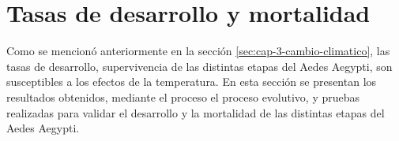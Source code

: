 \section{Tasas de desarrollo y mortalidad}

Como se mencionó anteriormente en la sección \ref{sec:cap-3-cambio-climatico}, las tasas de desarrollo,
supervivencia de las distintas etapas del Aedes Aegypti, son susceptibles a los efectos de la
temperatura. En esta sección se presentan los resultados obtenidos, mediante el proceso el proceso
evolutivo, y pruebas realizadas para validar el desarrollo y la mortalidad de las distintas etapas del
Aedes Aegypti.







